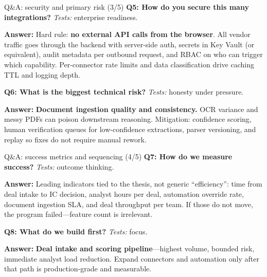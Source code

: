 \documentclass[aspectratio=169,11pt]{beamer}
\begin{document}
\begin{frame}{Q\&A: security and primary risk (3/5)}
  \footnotesize
  \textbf{Q5: How do you secure this many integrations?}
  \textit{Tests:} enterprise readiness.

  \textbf{Answer:} Hard rule: \textbf{no external API calls from the browser}. All vendor traffic goes through the backend with server-side auth, secrets in Key Vault (or equivalent), audit metadata per outbound request, and RBAC on who can trigger which capability. Per-connector rate limits and data classification drive caching TTL and logging depth.

  \vspace{0.4em}
  \textbf{Q6: What is the biggest technical risk?}
  \textit{Tests:} honesty under pressure.

  \textbf{Answer:} \textbf{Document ingestion quality and consistency.} OCR variance and messy PDFs can poison downstream reasoning. Mitigation: confidence scoring, human verification queues for low-confidence extractions, parser versioning, and replay so fixes do not require manual rework.
\end{frame}

\begin{frame}{Q\&A: success metrics and sequencing (4/5)}
  \footnotesize
  \textbf{Q7: How do we measure success?}
  \textit{Tests:} outcome thinking.

  \textbf{Answer:} Leading indicators tied to the thesis, not generic ``efficiency'': time from deal intake to IC decision, analyst hours per deal, automation override rate, document ingestion SLA, and deal throughput per team. If those do not move, the program failed---feature count is irrelevant.

  \vspace{0.4em}
  \textbf{Q8: What do we build first?}
  \textit{Tests:} focus.

  \textbf{Answer:} \textbf{Deal intake and scoring pipeline}---highest volume, bounded risk, immediate analyst load reduction. Expand connectors and automation only after that path is production-grade and measurable.
\end{frame}
\end{document}
